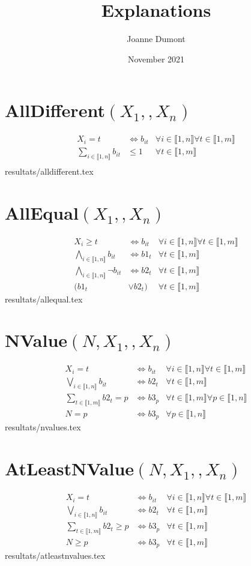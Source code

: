 \documentclass{article}
\title{Explanations}
\author{Joanne Dumont}
\date{November 2021}
\newcommand{\alldiff}{AllDifferent$(\{X_1,\ldots,X_n\})~$}
\newcommand{\alleq}{AllEqual$(\{X_1,\ldots,X_n\})~$}
\newcommand{\nvalue}{NValue$(N,\{X_1,\ldots,X_n\})~$}
\newcommand{\atlnvalue}{AtLeastNValue$(N,\{X_1,\ldots,X_n\})~$}
\newcommand{\I}{i\in\llbracket1,n\rrbracket}
\newcommand{\T}{t\in\llbracket1,m\rrbracket}
\newcommand{\PP}{p\in\llbracket1,n\rrbracket}
\newcommand{\fai}{\forall\I}
\newcommand{\fat}{\forall\T}
\newcommand{\fap}{\forall\PP}
\newcommand{\fit}{\fai\fat}
\def\{{}%
\def\}{}%
\def\ldots{}%
\begin{document}
\maketitle

\section{\texorpdfstring{\alldiff}{alldiff}}
\begin{align*}
    X_i = t &\iff b_{it}&\fai\fat\\
    \sum_{\I} b_{it}&\leq 1&\fat\\
\end{align*}
{resultats/alldifferent.tex}

\section{\texorpdfstring{\alleq}{alleq}}
\begin{align*}
    X_i\geq t & \iff b_{it}&\fit\\
    \bigwedge_{\I} b_{it} &\iff b1_t &\fat\\
    \bigwedge_{\I} \neg b_{it} &\iff b2_t &\fat\\
    (b1_t &\vee b2_t) &\fat
\end{align*}
{resultats/allequal.tex}

\section{\texorpdfstring{\nvalue}{nvalue}}
\begin{align*}
    X_i=t &\iff b_{it}&\fit\\
    \bigvee_{\I}b_{it}&\iff b2_t&\fat\\
    \sum_{\T}b2_{t} = p&\iff b3_{p}&\fat\fap\\
    N= p &\iff b3_p&\fap
\end{align*}
{resultats/nvalues.tex}

\section{\texorpdfstring{\atlnvalue}{atlnvalue}}
\begin{align*}
    X_i=t &\iff b_{it}&\fit\\
    \bigvee_{\I}b_{it}&\iff b2_t&\fat\\
    \sum_{\T}b2_{t} \geq p&\iff b3_{p}&\fat\\
    N\geq p &\iff b3_p&\fat
\end{align*}
{resultats/atleastnvalues.tex}
\end{document}
